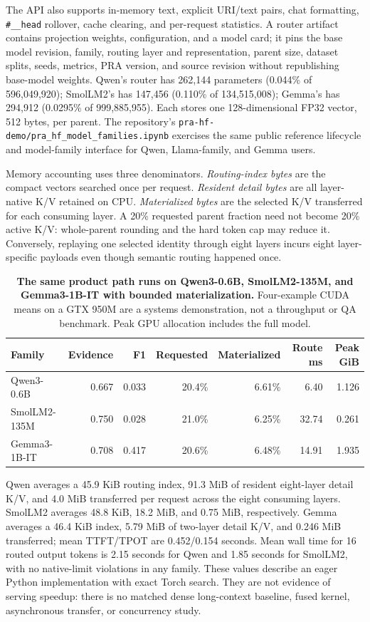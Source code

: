 \documentclass[11pt]{article}
\begin{document}
The API also supports in-memory text, explicit URI/text pairs, chat formatting,
\texttt{\#\_\_head} rollover, cache clearing, and per-request statistics. A router artifact
contains projection weights, configuration, and a model card; it pins the base model revision,
family, routing layer and representation, parent size, dataset splits, seeds, metrics, PRA
version, and source revision without republishing base-model weights. Qwen's router has 262,144
parameters (0.044\% of 596,049,920); SmolLM2's has 147,456 (0.110\% of 134,515,008); Gemma's has
294,912 (0.0295\% of 999,885,955). Each stores one 128-dimensional FP32 vector, 512 bytes, per parent.
The repository's \texttt{pra-hf-demo/pra\_hf\_model\_families.ipynb} exercises the same public
reference lifecycle and model-family interface for Qwen, Llama-family, and Gemma users.

Memory accounting uses three denominators. \emph{Routing-index bytes} are the compact vectors
searched once per request. \emph{Resident detail bytes} are all layer-native K/V retained on
CPU. \emph{Materialized bytes} are the selected K/V transferred for each consuming layer. A
20\% requested parent fraction need not become 20\% active K/V: whole-parent rounding and the
hard token cap may reduce it. Conversely, replaying one selected identity through eight layers
incurs eight layer-specific payloads even though semantic routing happened once.

\begin{table}[H]
\centering
\small
\caption{\textbf{The same product path runs on Qwen3-0.6B, SmolLM2-135M, and Gemma3-1B-IT with bounded
materialization.} Four-example CUDA means on a GTX 950M are a systems demonstration, not a
throughput or QA benchmark. Peak GPU allocation includes the full model.}
\label{tab:product-systems-main}
\begin{tabular}{lrrrrrr}
\toprule
Family & Evidence & F1 & Requested & Materialized & Route ms & Peak GiB \\
\midrule
Qwen3-0.6B & 0.667 & 0.033 & 20.4\% & 6.61\% & 6.40 & 1.126 \\
SmolLM2-135M & 0.750 & 0.028 & 21.0\% & 6.25\% & 32.74 & 0.261 \\
Gemma3-1B-IT & 0.708 & 0.417 & 20.6\% & 6.48\% & 14.91 & 1.935 \\
\bottomrule
\end{tabular}
\end{table}

Qwen averages a 45.9 KiB routing index, 91.3 MiB of resident eight-layer detail K/V, and
4.0 MiB transferred per request across the eight consuming layers. SmolLM2 averages 48.8 KiB,
18.2 MiB, and 0.75 MiB, respectively. Gemma averages a 46.4 KiB index, 5.79 MiB of two-layer
detail K/V, and 0.246 MiB transferred; mean TTFT/TPOT are 0.452/0.154 seconds. Mean wall time for
16 routed output tokens is 2.15 seconds for Qwen and 1.85 seconds for SmolLM2, with no native-limit
violations in any family. These values describe an
eager Python implementation with exact Torch search. They are not evidence of serving speedup:
there is no matched dense long-context baseline, fused kernel, asynchronous transfer, or
concurrency study.
\end{document}
